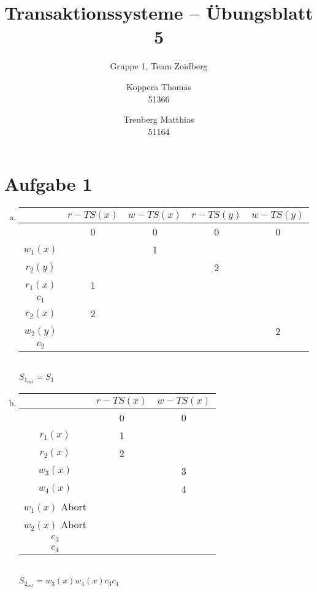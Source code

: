 \documentclass{scrartcl}
\title{Transaktionssysteme -- Übungsblatt 5}
\subtitle{Gruppe 1, Team Zoidberg}
\author{Koppera Thomas \\ 51366
 \and Treuberg Matthias \\ 51164}
\date{ }
\begin{document}
  \maketitle
  
\section*{Aufgabe 1}
\begin{enumerate}[a)]
\item
\begin{tabular}{c|c|c|c|c}
 & $r-TS(x)$ & $w-TS(x)$ & $r-TS(y)$ & $w-TS(y)$\\ 
\hline
  & 0 & 0 & 0 & 0 \\ 
$w_1(x)$  &  & 1 &  &  \\ 
$r_2(y)$  &  &  & 2 &  \\ 
$r_1(x)$  & 1 &  &  &  \\ 
$c_1$  &  &  &  &  \\ 
$r_2(x)$  & 2 &  &  &  \\
$w_2(y)$  &  &  &  & 2 \\ 
$c_2$  &  &  &  &  \\
\end{tabular}\\
$S_{1_{out}}= S_1$
\item
\begin{tabular}{c|c|c}
 & $r-TS(x)$ & $w-TS(x)$ \\ 
\hline
  & 0 & 0  \\ 
$r_1(x)$  & 1 &    \\ 
$r_2(x)$  & 2 &   \\ 
$w_3(x)$  &  & 3   \\ 
$w_4(x)$  &  & 4   \\ 
$w_1(x)$ Abort &  &    \\
$w_2(x)$ Abort &  &  \\
$c_3$  &  &    \\ 
$c_4$  &  &    \\ 
\end{tabular}\\
$S_{2_{out}}= w_3(x)w_4(x)c_3c_4$

\end{enumerate}
\end{document}
